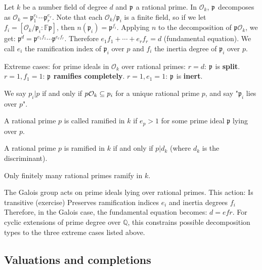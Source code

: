 \begin{outline}
Let $k$ be a number field of degree $d$ and $\mathfrak{p}$ a rational prime.
In $\mathcal{O}_k$, $\mathfrak{p}$ decomposes as $\mathcal{O}_k = \mathfrak{p}_1^{e_1} \cdots \mathfrak{p}_r^{e_r}$. Note that each $\mathcal{O}_k/\mathfrak{p}_i$ is a finite field, so if we let $f_i = [\mathcal{O}_k/\mathfrak{p}_i : \mathbb{F}\mathfrak{p}]$, then $n(\mathfrak{p}_i) = \mathfrak{p}^{f_i}$.
Applying $n$ to the decomposition of $\mathfrak{p}\mathcal{O}_k$, we get:
$\mathfrak{p}^d = \mathfrak{p}^{e_1f_1}\cdots\mathfrak{p}^{e_rf_r}$. Therefore $e_1f_1 + \cdots + e_rf_r = d$ (fundamental equation). We call $e_i$ the ramification index of $\mathfrak{p}_i$ over $p$ and $f_i$ the inertia degree of $\mathfrak{p}_i$ over $p$.

\1 Extreme cases: for prime ideals in $\mathcal{O}_k$ over rational primes:
    \2 $r=d$: $\mathfrak{p}$ is \textbf{split}.
    \2 $r=1, f_1 = 1$: $\mathfrak{p}$ \textbf{ramifies completely}. 
    \2 $r=1, e_1 = 1$: $\mathfrak{p}$ is \textbf{inert}. 

\0 We say $p_i | p$ if and only if $p\mathcal{O}_k \subseteq p_i$ for a unique rational prime $p$, and say "$\mathfrak{p}_i$ lies over $p$".

\0 \begin{definition}
A rational prime $p$ is called ramified in $k$ if $e_p > 1$ for some prime ideal $\mathfrak{p}$ lying over $p$.
\end{definition}

\0 \begin{theorem}
A rational prime $p$ is ramified in $k$ if and only if $p | d_k$ (where $d_k$ is the discriminant).
\end{theorem}

\0 \begin{theorem}
Only finitely many rational primes ramify in $k$.
\end{theorem}


\1 The Galois group acts on prime ideals lying over rational primes. This action:
    \2 Is transitive (exercise)
    \2 Preserves ramification indices $e_i$ and inertia degrees $f_i$
\1[] Therefore, in the Galois case, the fundamental equation becomes: $d = efr$.
For cyclic extensions of prime degree over $\mathbb{Q}$, this constrains possible decomposition types to the three extreme cases listed above.
\end{outline}

\subsection{Valuations and completions}

